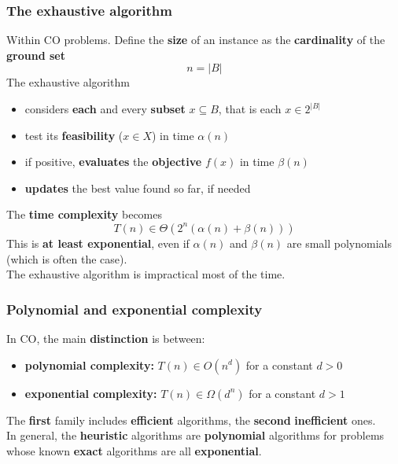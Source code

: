 \documentclass[11pt]{article}
\begin{document}
	\newpage
	
	\subsubsection{The exhaustive algorithm}
	Within CO problems. Define the \textbf{size} of an instance as the \textbf{cardinality} of the \textbf{ground set}
	$$ n = |B| $$
	The exhaustive algorithm
	\begin{itemize}
		\item considers \textbf{each} and every \textbf{subset} $x \subseteq B$, that is each $x \in 2^{|B|}$
		\item test its \textbf{feasibility} ($x \in X$) in time $\alpha (n)$
		\item if positive, \textbf{evaluates} the \textbf{objective} $f(x)$ in time $\beta(n)$
		\item \textbf{updates} the best value found so far, if needed
	\end{itemize}
	The \textbf{time complexity} becomes
	$$ T(n) \in \Theta \left(2^n \left(\alpha (n) + \beta (n)\right)\right) $$
	This is \textbf{at least exponential}, even if $\alpha (n)$ and $\beta(n)$ are small polynomials (which is often the case).\\
	
	The exhaustive algorithm is impractical most of the time.
	
	\subsubsection{Polynomial and exponential complexity}
	In CO, the main \textbf{distinction} is between: 
	\begin{itemize}
		\item \textbf{polynomial complexity:} $T(n) \in O (n^d)$ for a constant $d > 0$
		\item \textbf{exponential complexity:} $T(n) \in \Omega(d^n)$ for a constant $d > 1$
	\end{itemize}
	The \textbf{first} family includes \textbf{efficient} algorithms, the \textbf{second} \textbf{inefficient} ones.\\
	
	In general, the \textbf{heuristic} algorithms are \textbf{polynomial} algorithms for problems whose known \textbf{exact} algorithms are all \textbf{exponential}.\\
	
	\newpage
	
\end{document}
